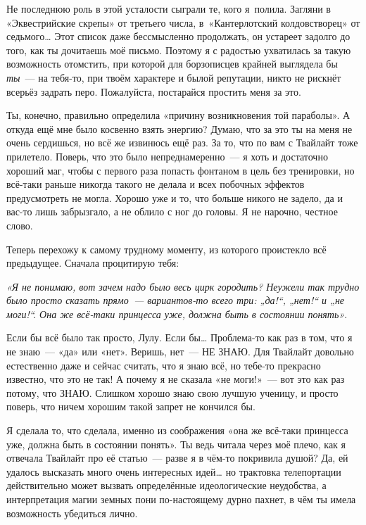 \documentclass[fontsize=11pt,a5paper,titlepage=firstcover]{scrbook}
\begin{document}
Не последнюю роль в этой усталости сыграли те, кого я~полила. Загляни в «Эквестрийские скрепы» от третьего числа, в~«Кантерлотский колдовстворец» от седьмого{\ldots} Этот список даже бессмысленно продолжать, он устареет задолго до того, как ты дочитаешь моё письмо. Поэтому я с радостью ухватилась за такую возможность отомстить, при которой для борзописцев крайней выглядела бы \emph{ты}~--- на тебя-то, при твоём характере и былой репутации, никто не рискнёт всерьёз задрать перо. Пожалуйста, постарайся простить меня за это.

Ты, конечно, правильно определила «причину возникновения той параболы». А откуда ещё мне было косвенно взять энергию? Думаю, что за это ты на меня не очень сердишься, но всё же извинюсь ещё раз. За то, что по вам с Твайлайт тоже прилетело. Поверь, что это было непреднамеренно~--- я хоть и достаточно хороший маг, чтобы с первого раза попасть фонтаном в цель без тренировки, но всё-таки раньше никогда такого не делала и всех побочных эффектов предусмотреть не могла. Хорошо уже и то, что больше никого не задело, да и вас-то лишь забрызгало, а не облило с ног до головы. Я не нарочно, честное слово.

Теперь перехожу к самому трудному моменту, из которого проистекло всё предыдущее. Сначала процитирую тебя:

\emph{«Я не понимаю, вот зачем надо было весь цирк городить? Неужели так трудно было просто сказать прямо~--- вариантов-то всего три: „да!“, „нет!“ и „не моги!“. Она же всё-таки принцесса уже, должна быть в состоянии понять»}.

Если бы всё было так просто, Лулу. Если бы{\ldots} Проблема-то как раз в том, что я не знаю~--- «да» или «нет». Веришь, нет~--- НЕ ЗНАЮ. Для Твайлайт довольно естественно даже и сейчас считать, что я знаю всё, но тебе-то прекрасно известно, что это не так! А почему я не сказала «не моги!»~--- вот это как раз потому, что ЗНАЮ. Слишком хорошо знаю свою лучшую ученицу, и просто поверь, что ничем хорошим такой запрет не кончился бы.

Я сделала то, что сделала, именно из соображения «она же всё-таки принцесса уже, должна быть в состоянии понять». Ты ведь читала через моё плечо, как я отвечала Твайлайт про её статью~--- разве я в чём-то покривила душой? Да, ей удалось высказать много очень интересных идей{\ldots} но трактовка телепортации действительно может вызвать определённые идеологические неудобства, а интерпретация магии земных пони по-настоящему дурно пахнет, в чём ты имела возможность убедиться лично.
\end{document}
